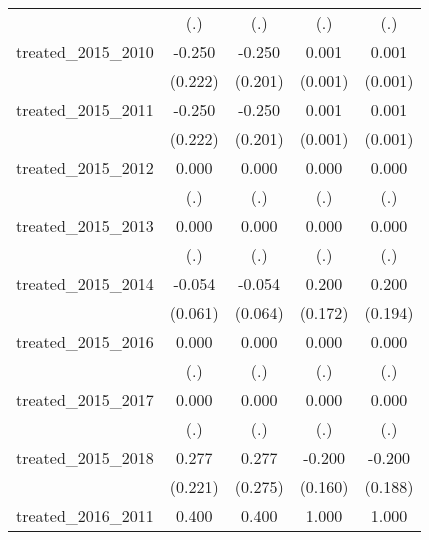 {\begin{tabular}{l*{4}{c}}
            &         (.)         &         (.)         &         (.)         &         (.)         \\
[1em]
treated\_2015\_2010&      -0.250         &      -0.250         &       0.001         &       0.001         \\
            &     (0.222)         &     (0.201)         &     (0.001)         &     (0.001)         \\
[1em]
treated\_2015\_2011&      -0.250         &      -0.250         &       0.001         &       0.001         \\
            &     (0.222)         &     (0.201)         &     (0.001)         &     (0.001)         \\
[1em]
treated\_2015\_2012&       0.000         &       0.000         &       0.000         &       0.000         \\
            &         (.)         &         (.)         &         (.)         &         (.)         \\
[1em]
treated\_2015\_2013&       0.000         &       0.000         &       0.000         &       0.000         \\
            &         (.)         &         (.)         &         (.)         &         (.)         \\
[1em]
treated\_2015\_2014&      -0.054         &      -0.054         &       0.200         &       0.200         \\
            &     (0.061)         &     (0.064)         &     (0.172)         &     (0.194)         \\
[1em]
treated\_2015\_2016&       0.000         &       0.000         &       0.000         &       0.000         \\
            &         (.)         &         (.)         &         (.)         &         (.)         \\
[1em]
treated\_2015\_2017&       0.000         &       0.000         &       0.000         &       0.000         \\
            &         (.)         &         (.)         &         (.)         &         (.)         \\
[1em]
treated\_2015\_2018&       0.277         &       0.277         &      -0.200         &      -0.200         \\
            &     (0.221)         &     (0.275)         &     (0.160)         &     (0.188)         \\
[1em]
treated\_2016\_2011&       0.400         &       0.400         &       1.000         &       1.000         \\

\end{tabular}}
